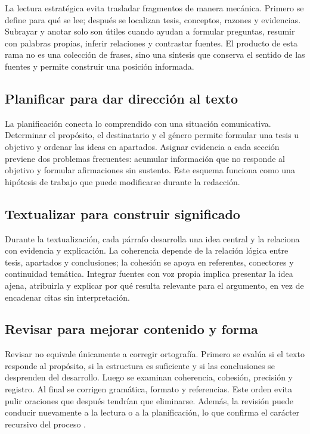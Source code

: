 \documentclass[spanish,letterpaper,oneside]{article}
\begin{document}
La lectura estratégica evita trasladar fragmentos de manera mecánica. Primero se define para qué se lee; después se localizan tesis, conceptos, razones y evidencias. Subrayar y anotar solo son útiles cuando ayudan a formular preguntas, resumir con palabras propias, inferir relaciones y contrastar fuentes. El producto de esta rama no es una colección de frases, sino una síntesis que conserva el sentido de las fuentes y permite construir una posición informada.

\subsection{Planificar para dar dirección al texto}

La planificación conecta lo comprendido con una situación comunicativa. Determinar el propósito, el destinatario y el género permite formular una tesis u objetivo y ordenar las ideas en apartados. Asignar evidencia a cada sección previene dos problemas frecuentes: acumular información que no responde al objetivo y formular afirmaciones sin sustento. Este esquema funciona como una hipótesis de trabajo que puede modificarse durante la redacción.

\subsection{Textualizar para construir significado}

Durante la textualización, cada párrafo desarrolla una idea central y la relaciona con evidencia y explicación. La coherencia depende de la relación lógica entre tesis, apartados y conclusiones; la cohesión se apoya en referentes, conectores y continuidad temática. Integrar fuentes con voz propia implica presentar la idea ajena, atribuirla y explicar por qué resulta relevante para el argumento, en vez de encadenar citas sin interpretación.

\subsection{Revisar para mejorar contenido y forma}

Revisar no equivale únicamente a corregir ortografía. Primero se evalúa si el texto responde al propósito, si la estructura es suficiente y si las conclusiones se desprenden del desarrollo. Luego se examinan coherencia, cohesión, precisión y registro. Al final se corrigen gramática, formato y referencias. Este orden evita pulir oraciones que después tendrían que eliminarse. Además, la revisión puede conducir nuevamente a la lectura o a la planificación, lo que confirma el carácter recursivo del proceso \citep{flowerHayesCognitiveProcess1981}.
\end{document}
